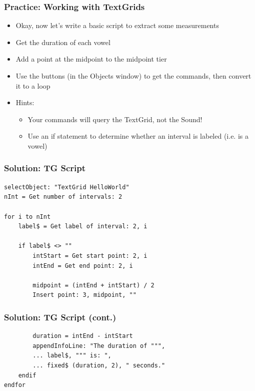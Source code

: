 \documentclass[handout]{beamer}
\begin{document}
\begin{frame}[fragile]
\frametitle{Practice: Working with TextGrids}

\begin{itemize}
    \item <1-> Okay, now let's write a basic script to extract some measurements

    \item <1-> Get the duration of each vowel

    \item <1-> Add a point at the midpoint to the midpoint tier

    \item <1-> Use the buttons (in the Objects window) to get the commands, then convert it to a loop

    \item Hints:
    \begin{itemize}
        \item Your commands will query the TextGrid, not the Sound!
        \item Use an if statement to determine whether an interval is labeled (i.e. is a vowel)
    \end{itemize}

\end{itemize}
\end{frame}

\begin{frame}[fragile]
\frametitle{Solution: TG Script}
\begin{verbatim}
selectObject: "TextGrid HelloWorld"
nInt = Get number of intervals: 2

for i to nInt
    label$ = Get label of interval: 2, i

    if label$ <> ""
        intStart = Get start point: 2, i
        intEnd = Get end point: 2, i

        midpoint = (intEnd + intStart) / 2
        Insert point: 3, midpoint, ""

\end{verbatim}
\end{frame}

\begin{frame}[fragile]
\frametitle{Solution: TG Script (cont.)}
\begin{verbatim}
        duration = intEnd - intStart
        appendInfoLine: "The duration of """,
        ... label$, """ is: ", 
        ... fixed$ (duration, 2), " seconds."
    endif
endfor
\end{verbatim}
\end{frame}
\end{document}
